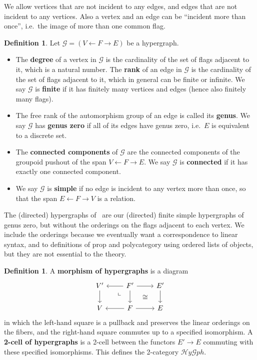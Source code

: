 \documentclass{article}
\theoremstyle{definition}
\newtheorem{defn}[thm]{Definition}
\theoremstyle{remark}
\def\G{\mathcal{G}}
\newcommand{\dlpullback}[1][dl]{\ar[#1,phantom,near start,"\llcorner"]}
\let\ot\leftarrow
\def\hy{\mathcal{H}\mathit{y}\mathcal{G}\mathit{ph}}
\begin{document}
We allow vertices that are not incident to any edges, and edges that are not incident to any vertices.
Also a vertex and an edge can be ``incident more than once'', i.e.\ the image of more than one common flag.

\begin{defn}
  Let $\G=(V\ot F\to E)$ be a hypergraph.
  \begin{itemize}
  \item The \textbf{degree} of a vertex in $\G$ is the cardinality of the set of flags adjacent to it, which is a natural number.
    The \textbf{rank} of an edge in $\G$ is the cardinality of the set of flags adjacent to it, which in general can be finite or infinite.
    We say $\G$ %
    is \textbf{finite} if it has finitely many vertices and edges (hence also finitely many flags).
  \item The free rank of the automorphism group of an edge is called its \textbf{genus}.
    We say $\G$ has \textbf{genus zero} if all of its edges have genus zero, i.e.\ $E$ is equivalent to a discrete set.
  \item The \textbf{connected components} of $\G$ are the connected components of the groupoid pushout of the span $V \leftarrow F \to E$.
    We say $\G$ is \textbf{connected} if it has exactly one connected component.
  \item We say $\G$ is \textbf{simple} if no edge is incident to any vertex more than once, so that the span $E \ot F \to V$ is a relation.
  \end{itemize}
\end{defn}

The (directed) hypergraphs of~\cite{glpn:directed-hypergraphs} are our (directed) finite simple hypergraphs of genus zero, but without the orderings on the flags adjacent to each vertex.
We include the orderings because we eventually want a correspondence to linear syntax, and to definitions of prop and polycategory using ordered lists of objects, but they are not essential to the theory.

\begin{defn}
  A \textbf{morphism of hypergraphs} is a diagram
  \[
  \begin{tikzcd}
    V' \ar[d] & F' \ar[d] \ar[r] \ar[l] \dlpullback[dl] \ar[dr,phantom,"\cong"] & E' \ar[d]\\
    V  & F \ar[r] \ar[l] & E
  \end{tikzcd}
  \]
  in which the left-hand square is a pullback and preserves the linear orderings on the fibers, and the right-hand square commutes up to a specified isomorphism.
  A \textbf{2-cell of hypergraphs} is a 2-cell between the functors $E'\to E$ commuting with these specified isomorphisms.
  This defines the 2-category $\hy$.
\end{defn}
\end{document}
